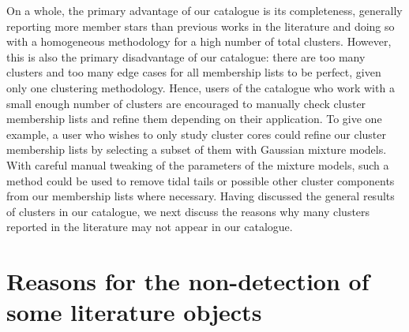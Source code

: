 On a whole, the primary advantage of our catalogue is its completeness, generally reporting more member stars than previous works in the literature and doing so with a homogeneous methodology for a high number of total clusters. However, this is also the primary disadvantage of our catalogue: there are too many clusters and too many edge cases for all membership lists to be perfect, given only one clustering methodology. Hence, users of the catalogue who work with a small enough number of clusters are encouraged to manually check cluster membership lists and refine them depending on their application. To give one example, a user who wishes to only study cluster cores could refine our cluster membership lists by selecting a subset of them with Gaussian mixture models. With careful manual tweaking of the parameters of the mixture models, such a method could be used to remove tidal tails or possible other cluster components from our membership lists where necessary. Having discussed the general results of clusters in our catalogue, we next discuss the reasons why many clusters reported in the literature may not appear in our catalogue.



\section{Reasons for the non-detection of some literature objects}\label{c3:sec:discussion-undetected}


